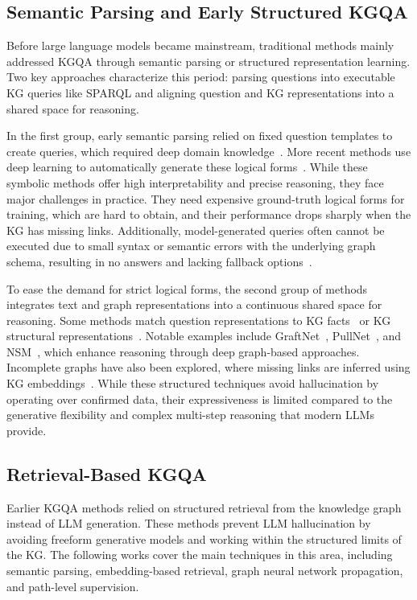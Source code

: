 \subsection{Semantic Parsing and Early Structured KGQA}

Before large language models became mainstream, traditional methods mainly addressed KGQA through semantic parsing or structured representation learning. Two key approaches characterize this period: parsing questions into executable KG queries like SPARQL and aligning question and KG representations into a shared space for reasoning.

In the first group, early semantic parsing relied on fixed question templates to create queries, which required deep domain knowledge~\citep{berant2013,reddy2014,bast2015}. More recent methods use deep learning to automatically generate these logical forms~\citep{yih2015,lan2020sparql}. While these symbolic methods offer high interpretability and precise reasoning, they face major challenges in practice. They need expensive ground-truth logical forms for training, which are hard to obtain, and their performance drops sharply when the KG has missing links. Additionally, model-generated queries often cannot be executed due to small syntax or semantic errors with the underlying graph schema, resulting in no answers and lacking fallback options~\citep{yu2023decaf,luo2025-graph-constrained-reasoning}.

To ease the demand for strict logical forms, the second group of methods integrates text and graph representations into a continuous shared space for reasoning. Some methods match question representations to KG facts~\citep{miller2016,xu2019} or KG structural representations~\citep{zhang2018,sen-etal-2023-knowledge}. Notable examples include GraftNet~\citep{sun2018graftnet}, PullNet~\citep{sun2019pullnet}, and NSM~\citep{he2021nsm}, which enhance reasoning through deep graph-based approaches. Incomplete graphs have also been explored, where missing links are inferred using KG embeddings~\citep{saxena2020}. While these structured techniques avoid hallucination by operating over confirmed data, their expressiveness is limited compared to the generative flexibility and complex multi-step reasoning that modern LLMs provide.

\subsection{Retrieval-Based KGQA}

Earlier KGQA methods relied on structured retrieval from the knowledge graph instead of LLM generation. These methods prevent LLM hallucination by avoiding freeform generative models and working within the structured limits of the KG. The following works cover the main techniques in this area, including semantic parsing, embedding-based retrieval, graph neural network propagation, and path-level supervision.

